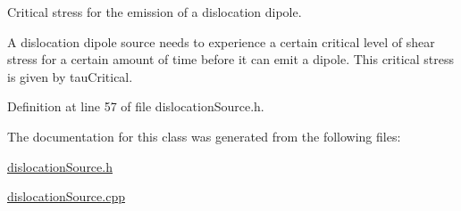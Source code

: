 Critical stress for the emission of a dislocation dipole. 

A dislocation dipole source needs to experience a certain critical level of shear stress for a certain amount of time before it can emit a dipole. This critical stress is given by tau\-Critical. 

Definition at line 57 of file dislocation\-Source.\-h.



The documentation for this class was generated from the following files\-:\begin{DoxyCompactItemize}
\item 
\hyperlink{dislocationSource_8h}{dislocation\-Source.\-h}\item 
\hyperlink{dislocationSource_8cpp}{dislocation\-Source.\-cpp}\end{DoxyCompactItemize}
